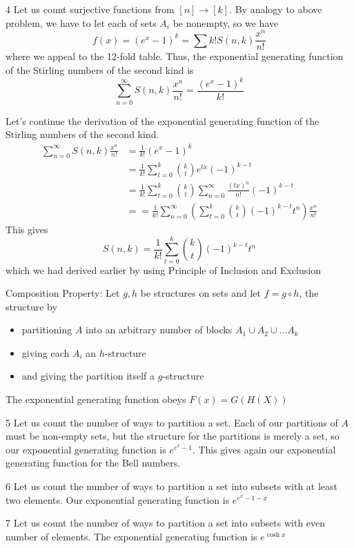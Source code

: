 \begin{example}4
    Let us count surjective functions from $[n] \rightarrow[k]$. By analogy to above problem, we have to let each of sets $A_{i}$ be nonempty, so we have
\[
    f(x)=\left(e^{x}-1\right)^{k}=\sum k ! S(n, k) \frac{x^{n}}{n !}
\]
where we appeal to the 12-fold table. Thus, the exponential generating function of the Stirling numbers of the second kind is
\[
    \sum_{n=0}^{\infty} S(n, k) \frac{x^{n}}{n !}=\frac{\left(e^{x}-1\right)^{k}}{k !}
\]
\end{example}
Let's continue the derivation of the exponential generating function of the Stirling numbers of the second kind.
\begin{align*}
    \sum_{n=0}^{\infty} S(n, k) \frac{x^{n}}{n !}
     & =\frac{1}{k !}\left(e^{x}-1\right)^{k} \\
    & =\frac{1}{k !} \sum_{t=0}^{k} \binom k t e^{tx} (-1)^{k-t} \\
    & =\frac{1}{k !} \sum_{t=0}^{k} \binom k t \sum_{n=0}^{\infty} \frac{(t x)^{n}}{n !}(-1)^{k-t} \\
    & = =\frac{1}{k !} \sum_{n=0}^{\infty}\left(\sum_{t=0}^{k} \binom k t (-1)^{k-t} t^{n}\right) \frac{x^{n}}{n !}
\end{align*}
This gives
\[
    S(n, k)=\frac{1}{k !} \sum_{t=0}^{k} \binom k t (-1)^{k-t} t^{n}
\]
which we had derived earlier by using Principle of Inclusion and Exclusion
\begin{theorem}
    Composition Property: Let $g, h$ be structures on sets and let $f=g \circ h$, the structure by
\begin{itemize}
    \item partitioning $A$ into an arbitrary number of blocks $A_{1} \cup A_{2} \cup \ldots A_{k}$
    \item giving each $A_{i}$ an $h$-structure
    \item and giving the partition itself a $g$-structure
\end{itemize}
The exponential generating function obeys $F(x)=G(H(X))$
\end{theorem}

\begin{example}5
    Let us count the number of ways to partition a set. Each of our partitions of $A$ must be non-empty sets, but the structure for the partitions is merely a set, so our exponential generating function is $e^{e^{x}-1}$. This gives again our exponential generating function for the Bell numbers.
\end{example}

\begin{example}6
    Let us count the number of ways to partition a set into subsets with at least two elements. Our exponential generating function is $e^{e^{x}-1-x}$
\end{example}

\begin{example}7
    Let us count the number of ways to partition a set into subsets with even number of elements. The exponential generating function is $e^{\cosh x}$
\end{example}

